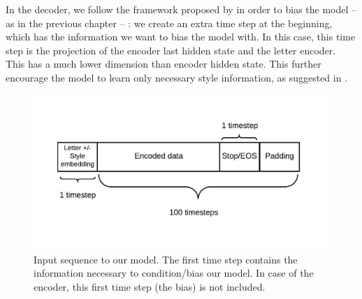     \par In the decoder, we follow the framework proposed by \cite{vinyals2015show} in order to bias the model -- as in the previous chapter -- : we create an extra time step at the beginning, which has the information we want to bias the model with. In this case, this time step is the projection of the encoder last hidden state and the letter encoder. This has a much lower dimension than encoder hidden state. This further encourage the model to learn only necessary style information, as suggested in \cite{DBLP:journals/corr/abs-1803-09047}.

    \begin{figure}[htbp!]
      \centering
      \includegraphics[scale=0.9]{images/framework/input_shape.jpeg}
      \caption{Input sequence to our model. The first time step contains the information necessary to condition/bias our model. In case of the encoder, this first time step (the bias) is not included.}
      \label{fig:input_shape}
    \end{figure}


